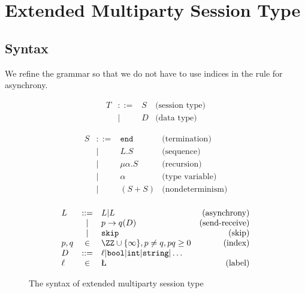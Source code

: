 \section{Extended Multiparty Session Type}
\subsection{Syntax}
We refine the grammar so that we do not have to use indices in the rule for asynchrony.

\begin{figure}[ht]
  $$\begin{array}{lclr}
      T & ::= & S & \text{(session type)} \\
        & |   & D & \text{(data type)}
    \end{array}$$

  \begin{center}
    \begin{minipage}{0.45\textwidth}
      $$\begin{array}{lclr}
          S & ::= & \texttt{end} & \text{(termination)}    \\
            & |   & L.S          & \text{(sequence)}       \\
            & |   & \mu\alpha.S  & \text{(recursion)}      \\
            & |   & \alpha       & \text{(type variable)}  \\
            & |   & (S+S)        & \text{(nondeterminism)} \\
        \end{array}$$
    \end{minipage}
    \hfill
    \begin{minipage}{0.53\textwidth}
      $$\begin{array}{lclr}
          L    & ::= & L | L                                                         & \text{(asynchrony)}   \\
               & |   & p\rightarrow q(D)                                             & \text{(send-receive)} \\
               & |   & \texttt{skip}                                                 & \text{(skip)}         \\
          p,q  & \in & \ZZ\cup\{\infty\}, p\ne q, pq\ge 0                            & \text{(index)}        \\
          D    & ::= & \ell | \texttt{bool} | \texttt{int} | \texttt{string} |\ldots &                       \\
          \ell & \in & \L                                                            & \text{(label)}        \\
        \end{array}$$
    \end{minipage}
  \end{center}
  \caption{The syntax of extended multiparty session type}
  \label{syntax}
\end{figure}

